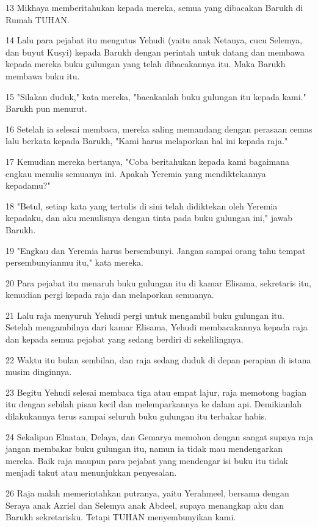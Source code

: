 \par 13 Mikhaya memberitahukan kepada mereka, semua yang dibacakan Barukh di Rumah TUHAN.
\par 14 Lalu para pejabat itu mengutus Yehudi (yaitu anak Netanya, cucu Selemya, dan buyut Kusyi) kepada Barukh dengan perintah untuk datang dan membawa kepada mereka buku gulungan yang telah dibacakannya itu. Maka Barukh membawa buku itu.
\par 15 "Silakan duduk," kata mereka, "bacakanlah buku gulungan itu kepada kami." Barukh pun menurut.
\par 16 Setelah ia selesai membaca, mereka saling memandang dengan perasaan cemas lalu berkata kepada Barukh, "Kami harus melaporkan hal ini kepada raja."
\par 17 Kemudian mereka bertanya, "Coba beritahukan kepada kami bagaimana engkau menulis semuanya ini. Apakah Yeremia yang mendiktekannya kepadamu?"
\par 18 "Betul, setiap kata yang tertulis di sini telah didiktekan oleh Yeremia kepadaku, dan aku menulisnya dengan tinta pada buku gulungan ini," jawab Barukh.
\par 19 "Engkau dan Yeremia harus bersembunyi. Jangan sampai orang tahu tempat persembunyianmu itu," kata mereka.
\par 20 Para pejabat itu menaruh buku gulungan itu di kamar Elisama, sekretaris itu, kemudian pergi kepada raja dan melaporkan semuanya.
\par 21 Lalu raja menyuruh Yehudi pergi untuk mengambil buku gulungan itu. Setelah mengambilnya dari kamar Elisama, Yehudi membacakannya kepada raja dan kepada semua pejabat yang sedang berdiri di sekelilingnya.
\par 22 Waktu itu bulan sembilan, dan raja sedang duduk di depan perapian di istana musim dinginnya.
\par 23 Begitu Yehudi selesai membaca tiga atau empat lajur, raja memotong bagian itu dengan sebilah pisau kecil dan melemparkannya ke dalam api. Demikianlah dilakukannya terus sampai seluruh buku gulungan itu terbakar habis.
\par 24 Sekalipun Elnatan, Delaya, dan Gemarya memohon dengan sangat supaya raja jangan membakar buku gulungan itu, namun ia tidak mau mendengarkan mereka. Baik raja maupun para pejabat yang mendengar isi buku itu tidak menjadi takut atau menunjukkan penyesalan.
\par 26 Raja malah memerintahkan putranya, yaitu Yerahmeel, bersama dengan Seraya anak Azriel dan Selemya anak Abdeel, supaya menangkap aku dan Barukh sekretarisku. Tetapi TUHAN menyembunyikan kami.
